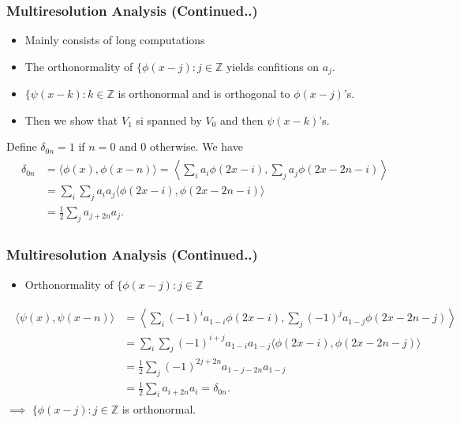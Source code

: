 \documentclass{beamer}
\begin{document}
\begin{frame}
    \frametitle{Multiresolution Analysis (Continued..)}
\begin{itemize}
    \item Mainly consists of long computations
    \item The orthonormality of $\{\phi(x-j) : j \in  \mathbb{Z}$ yields confitions on $a_j$.
    \item $\{\psi(x-k) : k \in  \mathbb{Z}$ is orthonormal and is orthogonal to $\phi(x-j)$'s.
    \item Then we show that $V_1$ si spanned by $V_0$ and then $\psi(x-k)$'s.
\end{itemize}
Define $\delta_{0n} = 1$ if $n = 0$ and $0$ otherwise. We have
\begin{eqnarray*}
    \begin{split}
        \delta_{0n} &= \langle \phi(x), \phi(x-n)\rangle = \left\langle \sum_i a_i\phi(2x-i),  \sum_j a_j\phi(2x-2n-i) \right\rangle \\
        &= \sum_i\sum_j a_ia_j \langle \phi(2x-i), \phi(2x-2n-i)\rangle\\
        &= \frac{1}{2} \sum_j a_{j+2n}a_j.
    \end{split}
\end{eqnarray*}
\end{frame}


\begin{frame}
    \frametitle{Multiresolution Analysis (Continued..)}
\begin{itemize}
    \item Orthonormality of $\{\phi(x-j) : j \in  \mathbb{Z}$ 
\end{itemize}
\begin{eqnarray*}
    \begin{split}
        \langle \psi(x), \psi(x-n)\rangle &= \left\langle \sum_i (-1)^i a_{1-i}\phi(2x-i),  \sum_j (-1)^ja_{1-j}\phi(2x-2n-j) \right\rangle \\
        &= \sum_i\sum_j (-1)^{i+j}a_{1-i}a_{1-j} \langle \phi(2x-i), \phi(2x-2n-j)\rangle\\
        &= \frac{1}{2} \sum_j  (-1)^{2j+2n}a_{1-j-2n}a_{1-j}\\
        &= \frac{1}{2} \sum_i a_{i+2n}a_i = \delta_{0n}.
    \end{split}
\end{eqnarray*}
$\implies$ $\{\phi(x-j) : j \in  \mathbb{Z}$ is orthonormal.
\end{frame}
\end{document}
